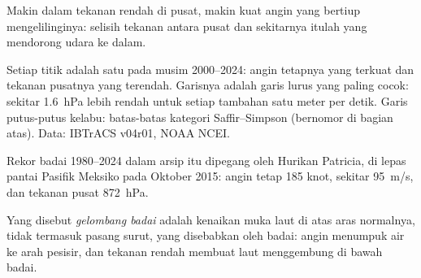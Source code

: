 Makin dalam tekanan rendah di pusat, makin kuat angin yang bertiup
mengelilinginya: selisih tekanan antara pusat dan sekitarnya itulah yang
mendorong udara ke dalam.

\begin{omfigure}

{\small Setiap titik adalah satu  pada musim 2000--2024: angin
tetapnya yang terkuat dan tekanan pusatnya yang terendah. Garisnya adalah
garis lurus yang paling cocok: sekitar \qty{1.6}{hPa} lebih rendah untuk
setiap tambahan satu meter per detik. Garis putus-putus kelabu: batas-batas
kategori Saffir--Simpson (bernomor di bagian atas). Data: IBTrACS v04r01, NOAA
NCEI.}
\end{omfigure}

Rekor badai 1980--2024 dalam arsip itu dipegang oleh Hurikan Patricia, di
lepas pantai Pasifik Meksiko pada Oktober 2015: angin tetap 185 knot, sekitar
\qty{95}{m/s}, dan tekanan pusat \qty{872}{hPa}.

\begin{definition}\label{def:g10:storms-and-cyclones:storm-surge}
Yang disebut \emph{gelombang badai} adalah kenaikan
muka laut di atas aras normalnya, tidak termasuk pasang surut, yang disebabkan
oleh badai: angin menumpuk air ke arah pesisir, dan tekanan rendah membuat
laut menggembung di bawah badai.
\end{definition}

